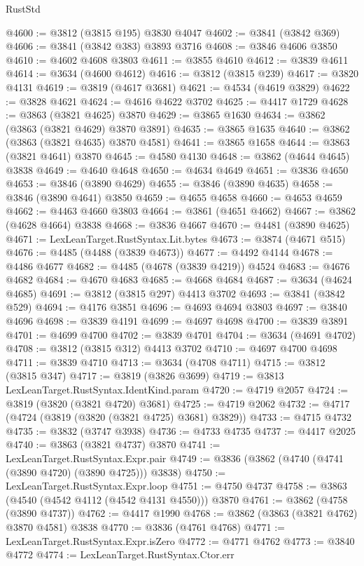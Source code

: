 \begin{lexlean}{RustStd}
\begin{coremodule}
@4600 := @3812 (@3815 @195) @3830 @4047
@4602 := @3841 (@3842 @369)
@4606 := @3841 (@3842 @383) @3893 @3716
@4608 := @3846 @4606 @3850
@4610 := @4602 @4608 @3803
@4611 := @3855 @4610
@4612 := @3839 @4611
@4614 := @3634 (@4600 @4612)
@4616 := @3812 (@3815 @239)
@4617 := @3820 @4131
@4619 := @3819 (@4617 @3681)
@4621 := @4534 (@4619 @3829)
@4622 := @3828 @4621
@4624 := @4616 @4622 @3702
@4625 := @4417 @1729
@4628 := @3863 (@3821 @4625) @3870
@4629 := @3865 @1630
@4634 := @3862 (@3863 (@3821 @4629) @3870 @3891)
@4635 := @3865 @1635
@4640 := @3862 (@3863 (@3821 @4635) @3870 @4581)
@4641 := @3865 @1658
@4644 := @3863 (@3821 @4641) @3870
@4645 := @4580 @4130
@4648 := @3862 (@4644 @4645) @3838
@4649 := @4640 @4648
@4650 := @4634 @4649
@4651 := @3836 @4650
@4653 := @3846 (@3890 @4629)
@4655 := @3846 (@3890 @4635)
@4658 := @3846 (@3890 @4641) @3850
@4659 := @4655 @4658
@4660 := @4653 @4659
@4662 := @4463 @4660 @3803
@4664 := @3861 (@4651 @4662)
@4667 := @3862 (@4628 @4664) @3838
@4668 := @3836 @4667
@4670 := @4481 (@3890 @4625)
@4671 := LexLeanTarget.RustSyntax.Lit.bytes
@4673 := @3874 (@4671 @515)
@4676 := @4485 (@4488 (@3839 @4673))
@4677 := @4492 @4144
@4678 := @4486 @4677
@4682 := @4485 (@4678 (@3839 @4219)) @4524
@4683 := @4676 @4682
@4684 := @4670 @4683
@4685 := @4668 @4684
@4687 := @3634 (@4624 @4685)
@4691 := @3812 (@3815 @297) @4413 @3702
@4693 := @3841 (@3842 @529)
@4694 := @4176 @3851
@4696 := @4693 @4694 @3803
@4697 := @3840 @4696
@4698 := @3839 @4191
@4699 := @4697 @4698
@4700 := @3839 @3891
@4701 := @4699 @4700
@4702 := @3839 @4701
@4704 := @3634 (@4691 @4702)
@4708 := @3812 (@3815 @312) @4413 @3702
@4710 := @4697 @4700 @4698
@4711 := @3839 @4710
@4713 := @3634 (@4708 @4711)
@4715 := @3812 (@3815 @347)
@4717 := @3819 (@3826 @3699)
@4719 := @3813 LexLeanTarget.RustSyntax.IdentKind.param
@4720 := @4719 @2057
@4724 := @3819 (@3820 (@3821 @4720) @3681)
@4725 := @4719 @2062
@4732 := @4717 (@4724 (@3819 (@3820 (@3821 @4725) @3681) @3829))
@4733 := @4715 @4732
@4735 := @3832 (@3747 @3938)
@4736 := @4733 @4735
@4737 := @4417 @2025
@4740 := @3863 (@3821 @4737) @3870
@4741 := LexLeanTarget.RustSyntax.Expr.pair
@4749 := @3836 (@3862 (@4740 (@4741 (@3890 @4720) (@3890 @4725))) @3838)
@4750 := LexLeanTarget.RustSyntax.Expr.loop
@4751 := @4750 @4737
@4758 := @3863 (@4540 (@4542 @4112 (@4542 @4131 @4550))) @3870
@4761 := @3862 (@4758 (@3890 @4737))
@4762 := @4417 @1990
@4768 := @3862 (@3863 (@3821 @4762) @3870 @4581) @3838
@4770 := @3836 (@4761 @4768)
@4771 := LexLeanTarget.RustSyntax.Expr.isZero
@4772 := @4771 @4762
@4773 := @3840 @4772
@4774 := LexLeanTarget.RustSyntax.Ctor.err

\end{coremodule}
\end{lexlean}
